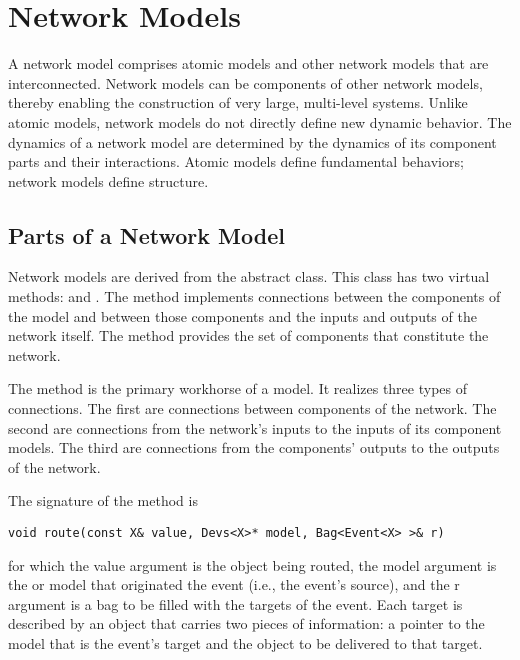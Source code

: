 \chapter{Network Models}
\label{chapter:network_models}
A network model comprises atomic models and other network models that are interconnected. Network models can be components of other network models, thereby enabling the construction of very large, multi-level systems. Unlike atomic models, network models do not directly define new dynamic behavior. The dynamics of a network model are determined by the dynamics of its component parts and their interactions. Atomic models define fundamental behaviors; network models define structure. 

\section{Parts of a Network Model}
\label{section:parts_of_a_network_model}
Network models are derived from the abstract  class. This class has two virtual methods:  and . The  method implements connections between the components of the  model and between those components and the inputs and outputs of the network itself. The  method provides the set of components that constitute the network.

The  method is the primary workhorse of a  model. It realizes three types of connections. The first are connections between components of the network. The second are connections from the network's inputs to the inputs of its component models. The third are connections from the components' outputs to the outputs of the network.

The signature of the  method is
\begin{verbatim}
void route(const X& value, Devs<X>* model, Bag<Event<X> >& r) 
\end{verbatim}
for which the value argument is the object being routed, the model argument is the  or  model that originated the event (i.e., the event's source), and the r argument is a bag to be filled with the targets of the event. Each target is described by an  object that carries two pieces of information: a pointer to the model that is the event's target and the object to be delivered to that target.

